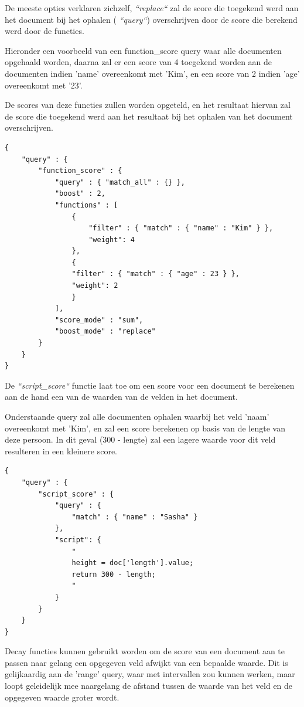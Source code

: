 De meeste opties verklaren zichzelf, \textit{``replace``} zal de score die toegekend werd aan het document bij het ophalen ( \textit{``query``}) overschrijven door de score die berekend werd door de functies. 

\newpage
Hieronder een voorbeeld van een function\_score query waar alle documenten opgehaald worden, daarna zal er een score van 4 toegekend worden aan de documenten indien 'name' overeenkomt met 'Kim', en een score van 2 indien 'age' overeenkomt met '23'.

De scores van deze functies zullen worden opgeteld, en het resultaat hiervan zal de score die toegekend werd aan het resultaat bij het ophalen van het document overschrijven. 

\begin{lstlisting}[caption={Scoring: voorbeeld van een function\_score query}]
{
	"query" : {
		"function_score" : {
			"query" : { "match_all" : {} },
			"boost" : 2,
			"functions" : [
				{
					"filter" : { "match" : { "name" : "Kim" } },
					"weight": 4
				},
				{
				"filter" : { "match" : { "age" : 23 } },
				"weight": 2
				}
			],
			"score_mode" : "sum",
			"boost_mode" : "replace"
		}
	}
}
\end{lstlisting}

De \textit{``script\_score``} functie laat toe om een score voor een document te berekenen aan de hand een van de waarden van de velden in het document.

Onderstaande query zal alle documenten ophalen waarbij het veld 'naam' overeenkomt met 'Kim', en zal een score berekenen op basis van de lengte van deze persoon. In dit geval (300 - lengte) zal een lagere waarde voor dit veld resulteren in een kleinere score.

\begin{lstlisting}[caption={Scoring: voorbeeld van een script\_score query}]
{
	"query" : {
		"script_score" : {
			"query" : {
				"match" : { "name" : "Sasha" }
			},
			"script": {
				"
				height = doc['length'].value;
				return 300 - length;
				"
			}
		}
	}
}
\end{lstlisting}

Decay functies kunnen gebruikt worden om de score van een document aan te passen naar gelang een opgegeven veld afwijkt van een bepaalde waarde. Dit is gelijkaardig aan de 'range' query, waar met intervallen zou kunnen werken, maar loopt geleidelijk mee naargelang de afstand tussen de waarde van het veld en de opgegeven waarde groter wordt. 
\newline

